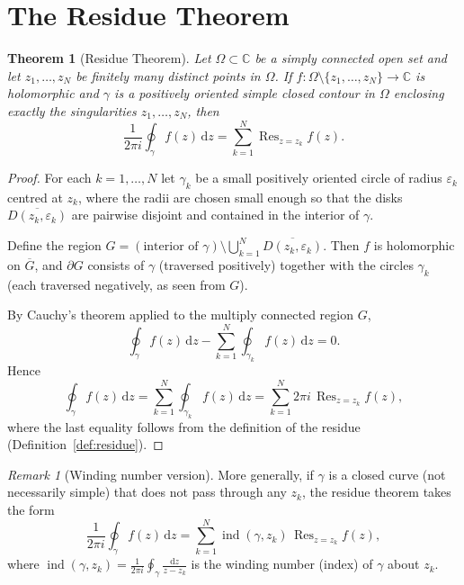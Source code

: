 \documentclass[12pt,a4paper,openany]{book}
\theoremstyle{definition}
\theoremstyle{plain}
\newtheorem{theorem}[definition]{Theorem}
\theoremstyle{remark}
\newtheorem{remark}[definition]{Remark}
\newcommand{\C}{\mathbb{C}}
\DeclareMathOperator{\Res}{Res}
\DeclareMathOperator{\ind}{ind}
\newcommand{\dd}{\mathrm{d}}
\begin{document}
\section{The Residue Theorem}\label{sec:residue-thm}

\begin{theorem}[Residue Theorem]\label{thm:residue}
Let $\Omega\subset\C$ be a simply connected open set and let
$z_1,\dots,z_N$ be finitely many distinct points in $\Omega$.  If
$f\colon\Omega\setminus\{z_1,\dots,z_N\}\to\C$ is holomorphic and
$\gamma$ is a positively oriented simple closed contour in $\Omega$
enclosing exactly the singularities $z_1,\dots,z_N$, then
\[
  \boxed{\frac{1}{2\pi i}\oint_{\gamma}f(z)\,\dd z
  =\sum_{k=1}^{N}\Res_{z=z_k}f(z).}
\]
\end{theorem}

\begin{proof}
For each $k=1,\dots,N$ let $\gamma_k$ be a small positively oriented
circle of radius $\varepsilon_k$ centred at $z_k$, where the radii are
chosen small enough so that the disks $\overline{D(z_k,\varepsilon_k)}$
are pairwise disjoint and contained in the interior of $\gamma$.

Define the region
$G=(\text{interior of }\gamma)\setminus\bigcup_{k=1}^N
\overline{D(z_k,\varepsilon_k)}$.
Then $f$ is holomorphic on $\overline{G}$, and $\partial G$ consists of
$\gamma$ (traversed positively) together with the circles $\gamma_k$
(each traversed negatively, as seen from $G$).

By Cauchy's theorem applied to the multiply connected region $G$,
\[
  \oint_{\gamma}f(z)\,\dd z
  -\sum_{k=1}^{N}\oint_{\gamma_k}f(z)\,\dd z=0.
\]
Hence
\[
  \oint_{\gamma}f(z)\,\dd z
  =\sum_{k=1}^{N}\oint_{\gamma_k}f(z)\,\dd z
  =\sum_{k=1}^{N}2\pi i\,\Res_{z=z_k}f(z),
\]
where the last equality follows from the definition of the residue
(Definition~\ref{def:residue}).
\end{proof}

\begin{remark}[Winding number version]\label{rem:winding-residue}
More generally, if $\gamma$ is a closed curve (not necessarily simple)
that does not pass through any $z_k$, the residue theorem takes the form
\[
  \frac{1}{2\pi i}\oint_{\gamma}f(z)\,\dd z
  =\sum_{k=1}^{N}\ind(\gamma,z_k)\,\Res_{z=z_k}f(z),
\]
where $\ind(\gamma,z_k)=\frac{1}{2\pi i}\oint_{\gamma}\frac{\dd z}{z-z_k}$
is the winding number (index) of $\gamma$ about $z_k$.
\end{remark}
\end{document}
